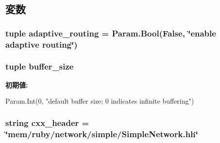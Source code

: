 \subsection{変数}
\hypertarget{classSimpleNetwork_1_1SimpleNetwork_ad9fbf9df67441ea1f5a11fc6c6755696}{
\subsubsection[{adaptive\_\-routing}]{\setlength{\rightskip}{0pt plus 5cm}tuple {\bf adaptive\_\-routing} = Param.Bool(False, \char`\"{}enable adaptive routing\char`\"{})}}
\label{classSimpleNetwork_1_1SimpleNetwork_ad9fbf9df67441ea1f5a11fc6c6755696}
\hypertarget{classSimpleNetwork_1_1SimpleNetwork_a0f14097399fa367505d7d06197f1498c}{
\subsubsection[{buffer\_\-size}]{\setlength{\rightskip}{0pt plus 5cm}tuple {\bf buffer\_\-size}}}
\label{classSimpleNetwork_1_1SimpleNetwork_a0f14097399fa367505d7d06197f1498c}
{\bfseries 初期値:}
\begin{DoxyCode}
Param.Int(0,
        "default buffer size; 0 indicates infinite buffering")
\end{DoxyCode}
\hypertarget{classSimpleNetwork_1_1SimpleNetwork_a17da7064bc5c518791f0c891eff05fda}{
\subsubsection[{cxx\_\-header}]{\setlength{\rightskip}{0pt plus 5cm}string {\bf cxx\_\-header} = \char`\"{}mem/ruby/network/simple/SimpleNetwork.hh\char`\"{}}}
\label{classSimpleNetwork_1_1SimpleNetwork_a17da7064bc5c518791f0c891eff05fda}


